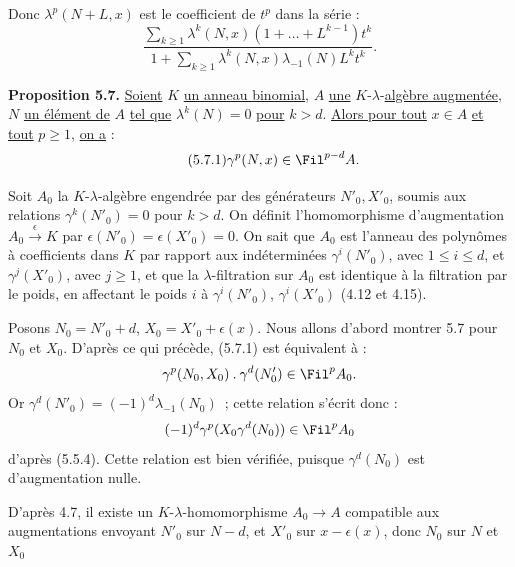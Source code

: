 

Donc \(\lambda^p(N+L,x)\) est le coefficient de \(t^p\) dans la série :
\[
  \frac{\displaystyle\sum_{k\ge1}\lambda^k(N,x)
        (1+\ldots+L^{k-1})t^k}
       {\displaystyle 1+\sum_{k\ge1}\lambda^k(N,x)
        \lambda_{-1}(N)L^k t^k}.
\]

\textbf{Proposition 5.7.} \uline{Soient} \(K\) \uline{un anneau binomial}, \(A\) \uline{une} \(K\)-\(\lambda\)-\uline{algèbre augmentée}, \(N\) \uline{un élément de} \(A\) \uline{tel que} \(\lambda^k(N)=0\) \uline{pour} \(k>d\). \uline{Alors pour tout} \(x\in A\) \uline{et tout} \(p\ge1\), \uline{on a} :
\begin{equation}\tag{5.7.1}
  \gamma^p(N,x)\in\Fil^{p-d}A.
\end{equation}

Soit \(A_0\) la \(K\)-\(\lambda\)-algèbre engendrée par des générateurs \(N'_0,X'_0\), soumis aux relations \(\gamma^k(N'_0)=0\) pour \(k>d\). On définit l'homomorphisme d'augmentation \(A_0\xrightarrow{\epsilon}K\) par \(\epsilon(N'_0)=\epsilon(X'_0)=0\). On sait que \(A_0\) est l'anneau des polynômes à coefficients dans \(K\) par rapport aux indéterminées \(\gamma^i(N'_0)\), avec \(1\le i\le d\), et \(\gamma^j(X'_0)\), avec \(j\ge1\), et que la \(\lambda\)-filtration sur \(A_0\) est identique à la filtration par le poids, en affectant le poids \(i\) à \(\gamma^i(N'_0)\), \(\gamma^i(X'_0)\) (4.12 et 4.15).

Posons \(N_0=N'_0+d\), \(X_0=X'_0+\epsilon(x)\). Nous allons d'abord montrer 5.7 pour \(N_0\) et \(X_0\). D'après ce qui précède, (5.7.1) est équivalent à :
\[
  \gamma^p(N_0,X_0)\mathbin{.}\gamma^d(N'_0)\in\Fil^pA_0.
\]
Or \(\gamma^d(N'_0)=(-1)^d\lambda_{-1}(N_0)\)~; cette relation s'écrit donc :
\[
  (-1)^d\gamma^p(X_0\gamma^d(N_0))\in\Fil^pA_0
\]
d'après (5.5.4). Cette relation est bien vérifiée, puisque \(\gamma^d(N_0)\) est d'augmentation nulle.

D'après 4.7, il existe un \(K\)-\(\lambda\)-homomorphisme \(A_0\longrightarrow A\) compatible aux augmentations envoyant \(N'_0\) sur \(N-d\), et \(X'_0\) sur \(x-\epsilon(x)\), donc \(N_0\) sur \(N\) et \(X_0\) 
